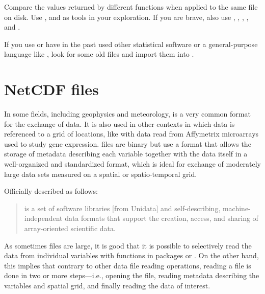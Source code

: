 \documentclass[krantz2]{krantz}\usepackage{knitr}
\begin{document}
\begin{playground}
Compare the values returned by different  functions when applied to the same file on disk. Use ,  and  as tools in your exploration. If you are brave, also use , , , ,  and .
\end{playground}

\begin{playground}
If you use or have in the past used other statistical software or a general-purpose language like , look for some old files and import them into \Rlang.
\end{playground}

\section{NetCDF files}

In some fields, including geophysics and meteorology,  is a very common format for the exchange of data. It is also used in other contexts in which data is referenced to a grid of locations, like with data read from Affymetrix microarrays used to study gene expression.  files are binary but use a format that allows the storage of metadata describing each variable together with the data itself in a well-organized and standardized format, which is ideal for exchange of moderately large data sets measured on a spatial or spatio-temporal grid.

Officially described as follows:
\begin{quote}
 is a set of software libraries [from Unidata] and self-describing, machine-independent data formats that support the creation, access, and sharing of array-oriented scientific data.
\end{quote}

As sometimes  files are large, it is good that it is possible to selectively read the data from individual variables with functions in packages  or . On the other hand, this implies that contrary to other data file reading operations, reading a  file is done in two or more steps---i.e., opening the file, reading metadata describing the variables and spatial grid, and finally reading the data of interest.
\end{document}
